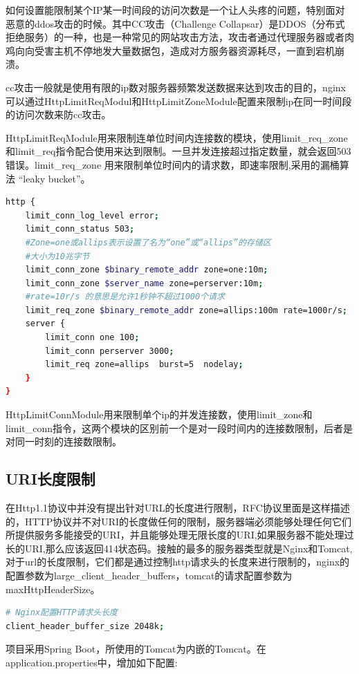\documentclass[letter]{book}
\begin{document}
如何设置能限制某个IP某一时间段的访问次数是一个让人头疼的问题，特别面对恶意的ddos攻击的时候。其中CC攻击（Challenge Collapsar）是DDOS（分布式拒绝服务）的一种，也是一种常见的网站攻击方法，攻击者通过代理服务器或者肉鸡向向受害主机不停地发大量数据包，造成对方服务器资源耗尽，一直到宕机崩溃。

cc攻击一般就是使用有限的ip数对服务器频繁发送数据来达到攻击的目的，nginx可以通过HttpLimitReqModul和HttpLimitZoneModule配置来限制ip在同一时间段的访问次数来防cc攻击。

HttpLimitReqModule用来限制连单位时间内连接数的模块，使用limit\_req\_zone和limit\_req指令配合使用来达到限制。一旦并发连接超过指定数量，就会返回503错误。limit\_req\_zone 用来限制单位时间内的请求数，即速率限制,采用的漏桶算法 “leaky bucket”。

\begin{lstlisting}[language=bash]
http {
	limit_conn_log_level error;
	limit_conn_status 503;
	#Zone=one或allips表示设置了名为“one”或“allips”的存储区
	#大小为10兆字节
	limit_conn_zone $binary_remote_addr zone=one:10m;
	limit_conn_zone $server_name zone=perserver:10m;
	#rate=10r/s 的意思是允许1秒钟不超过1000个请求
	limit_req_zone $binary_remote_addr zone=allips:100m rate=1000r/s;  
	server {
		limit_conn one 100;
		limit_conn perserver 3000;
		limit_req zone=allips  burst=5  nodelay;
	}
}
\end{lstlisting}

HttpLimitConnModule用来限制单个ip的并发连接数，使用limit\_zone和limit\_conn指令，这两个模块的区别前一个是对一段时间内的连接数限制，后者是对同一时刻的连接数限制。

\subsection{URI长度限制}

在Http1.1协议中并没有提出针对URL的长度进行限制，RFC协议里面是这样描述的，HTTP协议并不对URI的长度做任何的限制，服务器端必须能够处理任何它们所提供服务多能接受的URI，并且能够处理无限长度的URI,如果服务器不能处理过长的URI,那么应该返回414状态码。接触的最多的服务器类型就是Nginx和Tomcat,对于url的长度限制，它们都是通过控制http请求头的长度来进行限制的，nginx的配置参数为large\_client\_header\_buffers，tomcat的请求配置参数为maxHttpHeaderSize。

\begin{lstlisting}[language=bash]
# Nginx配置HTTP请求头长度
client_header_buffer_size 2048k;
\end{lstlisting}

项目采用Spring Boot，所使用的Tomcat为内嵌的Tomcat。在application.properties中，增加如下配置:
\end{document}
